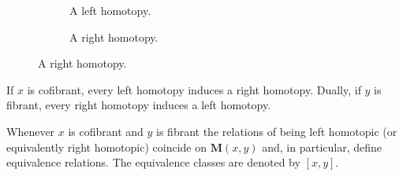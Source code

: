 {        \begin{figure}
            \centering
            \begin{subfigure}[b]{0.49\textwidth}
                \centering
                \caption{A left homotopy.}
                \label{fig:left_homotopy}
            \end{subfigure}
            \begin{subfigure}[b]{0.49\textwidth}
                \centering
                \caption{A right homotopy.}
                \label{fig:right_homotopy}
            \end{subfigure}
        \end{figure}
    }

    \begin{property}
        If $x$ is cofibrant, every left homotopy induces a right homotopy. Dually, if $y$ is fibrant, every right homotopy induces a left homotopy.
    \end{property}
    \begin{result}
        Whenever $x$ is cofibrant and $y$ is fibrant the relations of being left homotopic (or equivalently right homotopic) coincide on $\mathbf{M}(x, y)$ and, in particular, define equivalence relations. The equivalence classes are denoted by $[x,y]$.
    \end{result}

